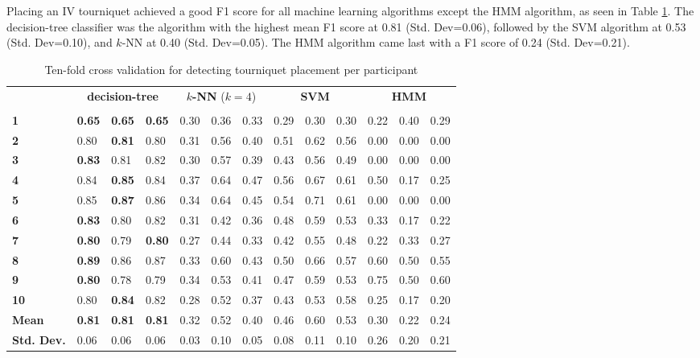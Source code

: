 \par Placing an IV tourniquet achieved a good F1 score for all machine learning algorithms except the HMM algorithm, as seen in Table \ref{tab:t:ml}. The decision-tree classifier was the algorithm with the highest mean F1 score at 0.81 (Std. Dev=0.06), followed by the SVM algorithm at 0.53 (Std. Dev=0.10), and $k$-NN at 0.40 (Std. Dev=0.05). The HMM algorithm came last with a F1 score of 0.24 (Std. Dev=0.21).
\begin{table}[h]
	\centering
	\begin{tabular}{lllllllllllll}
		\multirow{2}{*}{\rotatebox[origin=c]{45}{\textbf{Participant}}} & \multicolumn{3}{c}{\textbf{decision-tree}} & \multicolumn{3}{c}{\textbf{$k$-NN} ($k=4$)} & \multicolumn{3}{c}{\textbf{SVM}} & \multicolumn{3}{c}{\textbf{HMM}} \\
		& \rot{Precision}     & \rot{Recall}    & \rot{F1}    & \rot{Precision}     & \rot{Recall}    & \rot{F1}  & \rot{Precision}     & \rot{Recall}    & \rot{F1} & \rot{Precision}     & \rot{Recall}    & \rot{F1} \\
		\textbf{1}   & \textbf{0.65} & \textbf{0.65} & \textbf{0.65} & 0.30 & 0.36 & 0.33 & 0.29 & 0.30 & 0.30 & 0.22 & 0.40 & 0.29 \\
		\textbf{2}   & 0.80 & \textbf{0.81} & 0.80 & 0.31 & 0.56 & 0.40 & 0.51 & 0.62 & 0.56 & 0.00 & 0.00 & 0.00 \\
		\textbf{3}   & \textbf{0.83} & 0.81 & 0.82 & 0.30 & 0.57 & 0.39 & 0.43 & 0.56 & 0.49 & 0.00 & 0.00 & 0.00 \\
		\textbf{4}   & 0.84 & \textbf{0.85} & 0.84 & 0.37 & 0.64 & 0.47 & 0.56 & 0.67 & 0.61 & 0.50 & 0.17 & 0.25 \\
		\textbf{5}   & 0.85 & \textbf{0.87} & 0.86 & 0.34 & 0.64 & 0.45 & 0.54 & 0.71 & 0.61 & 0.00 & 0.00 & 0.00 \\
		\textbf{6}   & \textbf{0.83} & 0.80 & 0.82 & 0.31 & 0.42 & 0.36 & 0.48 & 0.59 & 0.53 & 0.33 & 0.17 & 0.22 \\
		\textbf{7}   & \textbf{0.80} & 0.79 & \textbf{0.80} & 0.27 & 0.44 & 0.33 & 0.42 & 0.55 & 0.48 & 0.22 & 0.33 & 0.27 \\
		\textbf{8}   & \textbf{0.89} & 0.86 & 0.87 & 0.33 & 0.60 & 0.43 & 0.50 & 0.66 & 0.57 & 0.60 & 0.50 & 0.55 \\
		\textbf{9}   & \textbf{0.80} & 0.78 & 0.79 & 0.34 & 0.53 & 0.41 & 0.47 & 0.59 & 0.53 & 0.75 & 0.50 & 0.60 \\
		\textbf{10} & 0.80 & \textbf{0.84} & 0.82 & 0.28 & 0.52 & 0.37 & 0.43 & 0.53 & 0.58 & 0.25 & 0.17 & 0.20 \\
		\hline
		\textbf{Mean} & \textbf{0.81} & \textbf{0.81} & \textbf{0.81} & 0.32 & 0.52 & 0.40 & 0.46 & 0.60 & 0.53 & 0.30 & 0.22 & 0.24 \\
		\textbf{Std. Dev.} & 0.06 & 0.06 & 0.06 & 0.03 & 0.10 & 0.05 & 0.08 & 0.11 & 0.10 & 0.26 & 0.20 & 0.21
	\end{tabular}
	\caption{Ten-fold cross validation for detecting tourniquet placement per participant}
	\label{tab:t:ml}
\end{table}

